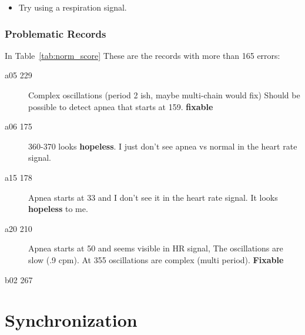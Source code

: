 \documentclass[12pt]{article}
\begin{document}
\begin{itemize}
\item Try using a respiration signal.
\end{itemize}

\subsubsection{Problematic Records}
\label{sec:problematic_records}

In Table~\ref{tab:norm_score} These are the records with more than 165
errors:
\begin{description}
\item[a05 229] Complex oscillations (period 2 ish, maybe multi-chain would
  fix) Should be possible to detect apnea that starts at 159.
  \textbf{fixable}
\item[a06 175] 360-370 looks \textbf{hopeless}.  I just don't see apnea vs
  normal in the heart rate signal.
\item[a15 178] Apnea starts at 33 and I don't see it in the heart rate
  signal.  It looks \textbf{hopeless} to me.
\item[a20 210] Apnea starts at 50 and seems visible in HR signal,  The
  oscillations are slow (.9 cpm).  At 355 oscillations are complex
  (multi period).  \textbf{Fixable}
\item[b02 267] 
\end{description}

\section{Synchronization}
\label{sec:sync}
\end{document}
